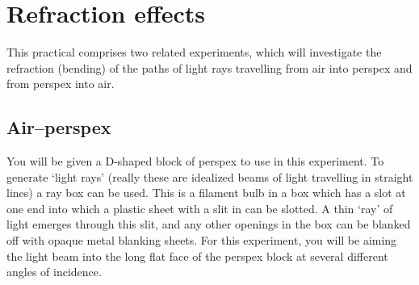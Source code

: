 \section{Refraction effects}
\label{refraction}

This practical comprises two related experiments, which will investigate the refraction (bending) of the paths of light rays travelling from air into perspex and from perspex into air.

\subsection{Air--perspex}

You will be given a D-shaped block of perspex to use in this experiment.  To generate `light rays' (really these are idealized beams of light travelling in straight lines) a ray box can be used.  This is a filament bulb in a box which has a slot at one end into which a plastic sheet with a slit in can be slotted.  A thin `ray' of light emerges through this slit, and any other openings in the box can be blanked off with opaque metal blanking sheets.  For this experiment, you will be aiming the light beam into the long flat face of the perspex block at several different angles of incidence.  

